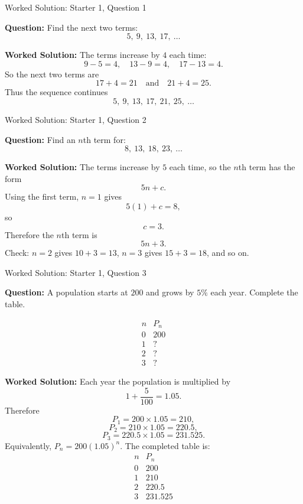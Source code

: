 \documentclass{beamer}
\begin{document}
\begin{frame}{Worked Solution: Starter 1, Question 1}
\hypertarget{work-st1}{}

\textbf{Question:} Find the next two terms:
\[
5,\ 9,\ 13,\ 17,\ \dots
\]

\textbf{Worked Solution:} The terms increase by \(4\) each time:
\[
9-5=4,\quad 13-9=4,\quad 17-13=4.
\]
So the next two terms are
\[
17+4=21 \quad \text{and} \quad 21+4=25.
\]
Thus the sequence continues
\[
5,\ 9,\ 13,\ 17,\ 21,\ 25,\ \dots
\]

\end{frame}

\begin{frame}{Worked Solution: Starter 1, Question 2}

\textbf{Question:} Find an \(n\)th term for:
\[
8,\ 13,\ 18,\ 23,\ \dots
\]

\textbf{Worked Solution:} The terms increase by \(5\) each time, so the \(n\)th term has the form
\[
5n + c.
\]
Using the first term, \(n=1\) gives
\[
5(1)+c=8,
\]
so
\[
c=3.
\]
Therefore the \(n\)th term is
\[
5n+3.
\]
Check: \(n=2\) gives \(10+3=13\), \(n=3\) gives \(15+3=18\), and so on.

\end{frame}

\begin{frame}{Worked Solution: Starter 1, Question 3}

\textbf{Question:} A population starts at \(200\) and grows by \(5\%\) each year. Complete the table.

\[
\begin{array}{c|c}
n & P_n \\
\hline
0 & 200 \\
1 & ? \\
2 & ? \\
3 & ?
\end{array}
\]

\textbf{Worked Solution:} Each year the population is multiplied by
\[
1+\frac{5}{100}=1.05.
\]
Therefore
\[
P_1=200 \times 1.05 = 210,
\]
\[
P_2=210 \times 1.05 = 220.5,
\]
\[
P_3=220.5 \times 1.05 = 231.525.
\]
Equivalently, \(P_n=200(1.05)^n\). The completed table is:
\[
\begin{array}{c|c}
n & P_n \\
\hline
0 & 200 \\
1 & 210 \\
2 & 220.5 \\
3 & 231.525
\end{array}
\]

\end{frame}
\end{document}
